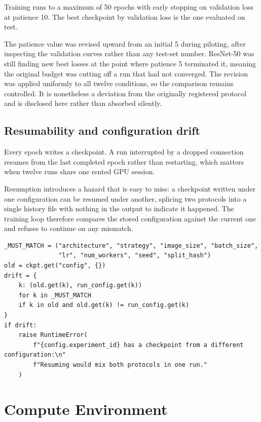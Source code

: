 Training runs to a maximum of 50 epochs with early stopping on validation loss at
patience 10. The best checkpoint by validation loss is the one evaluated on test.

The patience value was revised upward from an initial 5 during piloting, after inspecting
the validation curves rather than any test-set number. ResNet-50 was still finding new
best losses at the point where patience 5 terminated it, meaning the original budget was
cutting off a run that had not converged. The revision was applied uniformly to all
twelve conditions, so the comparison remains controlled. It is nonetheless a deviation
from the originally registered protocol and is disclosed here rather than absorbed
silently.

\subsection{Resumability and configuration drift}

Every epoch writes a checkpoint. A run interrupted by a dropped connection resumes from
the last completed epoch rather than restarting, which matters when twelve runs share
one rented GPU session.

Resumption introduces a hazard that is easy to miss: a checkpoint written under one
configuration can be resumed under another, splicing two protocols into a single history
file with nothing in the output to indicate it happened. The training loop therefore
compares the stored configuration against the current one and refuses to continue on any
mismatch.

\begin{lstlisting}[caption={Configuration drift guard, \texttt{src/ham10000/train.py}.},
                   label={lst:drift}]
_MUST_MATCH = ("architecture", "strategy", "image_size", "batch_size",
               "lr", "num_workers", "seed", "split_hash")
old = ckpt.get("config", {})
drift = {
    k: (old.get(k), run_config.get(k))
    for k in _MUST_MATCH
    if k in old and old.get(k) != run_config.get(k)
}
if drift:
    raise RuntimeError(
        f"{config.experiment_id} has a checkpoint from a different configuration:\n"
        f"Resuming would mix both protocols in one run."
    )
\end{lstlisting}

\section{Compute Environment}
\label{sec:method-compute}

